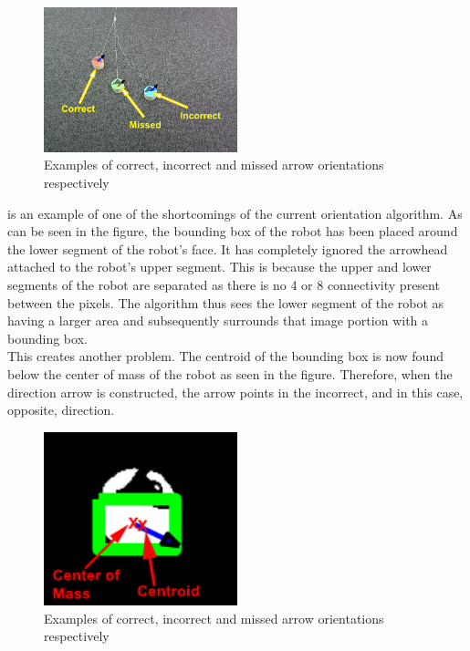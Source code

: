 \documentclass{article}
\begin{document}
\begin{figure}[h!]
	\centering
		\includegraphics[width=0.5\textwidth]{../Drawings/missedandIncorrectDetData2Ready.pdf}
	\caption{Examples of correct, incorrect and missed arrow orientations respectively}
	\label{fig:missIncorrect}
\end{figure}

 is an example of one of the shortcomings of the current orientation algorithm. As can be seen in the figure, the bounding box of the robot has been placed around the lower segment of the robot's face. It has completely ignored the arrowhead attached to the robot's upper segment. This is because the upper and lower segments of the robot are separated as there is no 4 or 8 connectivity present between the pixels. The algorithm thus sees the lower segment of the robot as having a larger area and subsequently surrounds that image portion with a bounding box. \\

This creates another problem. The centroid of the bounding box is now found below the center of mass of the robot as seen in the figure. Therefore, when the direction arrow is constructed, the arrow points in the incorrect, and in this case, opposite, direction.\\ 

  \begin{figure}[h!]
	\centering
		\includegraphics[width=0.5\textwidth]{../Drawings/IncorrectDirectionResults.pdf}
	\caption{Examples of correct, incorrect and missed arrow orientations respectively}
	\label{fig:indetect}
\end{figure}
\end{document}
